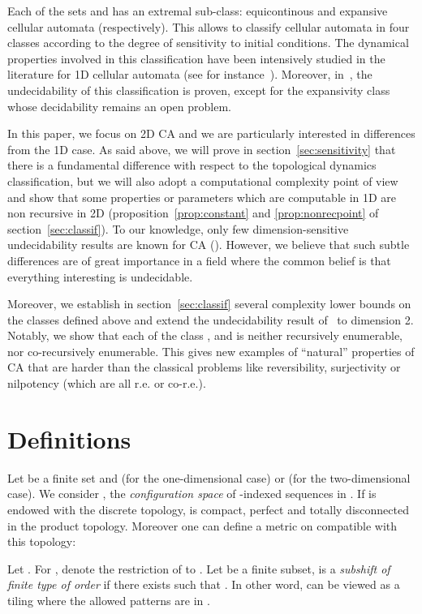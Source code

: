 \documentclass{llncs}
\begin{document}
Each of the sets  and  has an extremal sub-class:
equicontinous and expansive cellular automata (respectively).  This
allows to classify cellular automata in four classes according to the
degree of sensitivity to initial conditions. The dynamical properties
involved in this classification have been intensively studied in the
literature for 1D cellular automata (see for
instance~\cite{Kurka97,BlanchardMaass,tisseur,permExp}).
Moreover, in~\cite{varouch}, the undecidability of this classification
is proven, except for the expansivity class whose decidability remains
an open problem.

In this paper, we focus on 2D CA and we are particularly interested in
differences from the 1D case. As said above, we will prove in
section~\ref{sec:sensitivity} that there is a fundamental difference
with respect to the topological dynamics classification, but we will
also adopt a computational complexity point of view and show that some
properties or parameters which are computable in 1D are non recursive
in 2D (proposition~\ref{prop:constant} and \ref{prop:nonrecpoint} of
section~\ref{sec:classif}). To our knowledge, only few
dimension-sensitive undecidability results are known for CA
(\cite{kari94,Bernardi}).  However, we believe that such subtle
differences are of great importance in a field where the common belief
is that everything interesting is undecidable.

Moreover, we establish in section~\ref{sec:classif} several complexity
lower bounds on the classes defined above and extend the
undecidability result of~\cite{varouch} to dimension 2. Notably, we
show that each of the class ,  and  is neither
recursively enumerable, nor co-recursively enumerable. This gives new
examples of ``natural'' properties of CA that are harder than the
classical problems like reversibility, surjectivity or nilpotency
(which are all r.e. or co-r.e.).

\section{Definitions}

Let  be a finite set and  (for the one-dimensional case) or
 (for the two-dimensional case). We consider , the {\em
  configuration space} of -indexed sequences in . If  is
endowed with the discrete topology,  is compact, perfect and
totally disconnected in the product topology.  Moreover one can define
a metric on  compatible with this topology:


Let . For , denote  the
restriction of  to .  Let  be a finite subset,
 is a {\em subshift of finite type of order } if there exists
 such that . In other word,  can
be viewed as a tiling where the allowed patterns are in .
\end{document}
